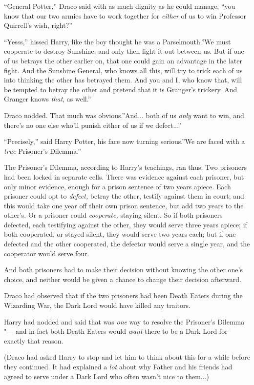 ``General Potter,'' Draco said with as much dignity as he could manage,
``you know that our two armies have to work together for \emph{either} of
us to win Professor Quirrell's wish, right?''

``Yesss,'' hissed Harry, like the boy thought he was a Parselmouth.''We
must cooperate to destroy Sunshine, and only then fight it out between
us. But if one of us betrays the other earlier on, that one could gain
an advantage in the later fight. And the Sunshine General, who knows all
this, will try to trick each of us into thinking the other has betrayed
them. And you and I, who know that, will be tempted to betray the other
and pretend that it is Granger's trickery. And Granger knows
\emph{that}, as well.''

Draco nodded. That much was obvious.''And... both of us \emph{only}
want to win, and there's no one else who'll punish either of us if we
defect...''

``Precisely,'' said Harry Potter, his face now turning serious.''We are
faced with a \emph{true} Prisoner's Dilemma.''

The Prisoner's Dilemma, according to Harry's teachings, ran thus: Two
prisoners had been locked in separate cells. There was evidence against
each prisoner, but only minor evidence, enough for a prison sentence of
two years apiece. Each prisoner could opt to \emph{defect,} betray the
other, testify against them in court; and this would take one year off
their own prison sentence, but add two years to the other's. Or a
prisoner could \emph{cooperate,} staying silent. So if both prisoners
defected, each testifying against the other, they would serve three
years apiece; if both cooperated, or stayed silent, they would serve two
years each; but if one defected and the other cooperated, the defector
would serve a single year, and the cooperator would serve four.

And both prisoners had to make their decision without knowing the other
one's choice, and neither would be given a chance to change their
decision afterward.

Draco had observed that if the two prisoners had been Death Eaters
during the Wizarding War, the Dark Lord would have killed any traitors.

Harry had nodded and said that was \emph{one} way to resolve the
Prisoner's Dilemma "--- and in fact both Death Eaters would \emph{want}
there to be a Dark Lord for exactly that reason.

(Draco had asked Harry to stop and let him to think about this for a
while before they continued. It had explained a \emph{lot} about why
Father and his friends had agreed to serve under a Dark Lord who often
wasn't nice to them...)

